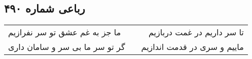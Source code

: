 \begin{center}
\section*{رباعی شماره ۴۹۰}
\label{sec:sh490}
\begin{longtable}{l p{0.5cm} r}
ما جز به غم عشق تو سر نفرازیم
&&
تا سر داریم در غمت دربازیم
\\
گر تو سر ما بی سر و سامان داری
&&
ماییم و سری در قدمت اندازیم
\\
\end{longtable}
\end{center}
